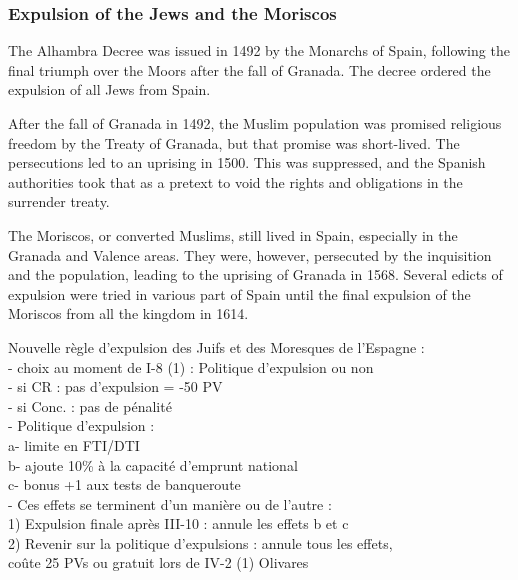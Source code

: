 \subsubsection{Expulsion of the Jews and the Moriscos}
\label{chSpecific:Spain:Expulsion}
\begin{histoire}
  The Alhambra Decree was issued in 1492 by the Monarchs of Spain,
  following the final triumph over the Moors after the fall of
  Granada. The decree ordered the expulsion of all Jews from Spain.

  After the fall of Granada in 1492, the Muslim population was promised
  religious freedom by the Treaty of Granada, but that promise was
  short-lived. The persecutions led to an uprising in 1500. This was
  suppressed, and the Spanish authorities took that as a pretext to void
  the rights and obligations in the surrender treaty.

  The Moriscos, or converted Muslims, still lived in Spain, especially
  in the Granada and Valence areas. They were, however, persecuted by
  the inquisition and the population, leading to the uprising of Granada
  in 1568. Several edicts of expulsion were tried in various part of
  Spain until the final expulsion of the Moriscos from all the kingdom
  in 1614.
\end{histoire}

\aparag  Nouvelle règle d'expulsion des Juifs et des Moresques de l'Espagne : \\
- choix au moment de I-8 (1) : Politique d'expulsion ou non \\
- si CR : pas d'expulsion = -50 PV \\
- si Conc. : pas de pénalité \\

- Politique d'expulsion : \\
a- limite en FTI/DTI \\
b- ajoute 10\% à la capacité d'emprunt national \\
c- bonus +1 aux tests de banqueroute \\
- Ces effets se terminent d'un manière ou de l'autre : \\
1) Expulsion finale après III-10 : annule les effets b et c \\
2) Revenir sur la politique d'expulsions : annule tous les effets, \\
coûte 25 PVs ou gratuit lors de IV-2 (1) Olivares \\


